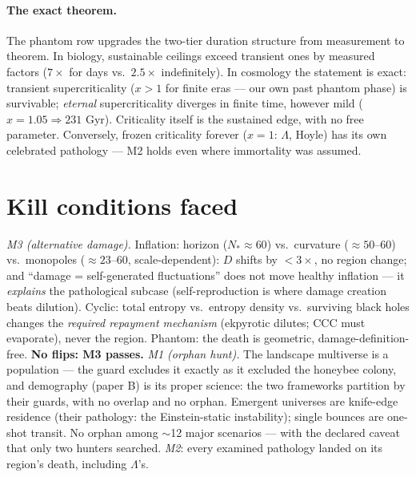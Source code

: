 \documentclass[11pt]{article}
\begin{document}
\paragraph{The exact theorem.} The phantom row upgrades the two-tier duration structure from
measurement to theorem. In biology, sustainable ceilings exceed transient ones by measured
factors ($7\times$ for days vs.\ $2.5\times$ indefinitely). In cosmology the statement is exact:
transient supercriticality ($x > 1$ for finite eras --- our own past phantom phase) is
survivable; \emph{eternal} supercriticality diverges in finite time, however mild
($x = 1.05 \Rightarrow 231$ Gyr). Criticality itself is the sustained edge, with no free
parameter. Conversely, frozen criticality forever ($x = 1$: $\Lambda$, Hoyle) has its own
celebrated pathology \cite{DKS} --- M2 holds even where immortality was assumed.

\section{Kill conditions faced}
\emph{M3 (alternative damage).} Inflation: horizon ($N_* \approx 60$) vs.\ curvature
($\approx 50$--$60$) vs.\ monopoles ($\approx 23$--$60$, scale-dependent): $D$ shifts by
$< 3\times$, no region change; and ``damage = self-generated fluctuations'' does not move
healthy inflation --- it \emph{explains} the pathological subcase (self-reproduction is where
damage creation beats dilution). Cyclic: total entropy vs.\ entropy density vs.\ surviving
black holes changes the \emph{required repayment mechanism} (ekpyrotic dilutes; CCC must
evaporate), never the region. Phantom: the death is geometric, damage-definition-free.
\textbf{No flips: M3 passes.} \emph{M1 (orphan hunt).} The landscape multiverse is a population
--- the guard excludes it exactly as it excluded the honeybee colony, and demography (paper B)
is its proper science: the two frameworks partition by their guards, with no overlap and no
orphan. Emergent universes are knife-edge residence (their pathology: the Einstein-static
instability); single bounces are one-shot transit. No orphan among $\sim$12 major scenarios ---
with the declared caveat that only two hunters searched. \emph{M2}: every examined pathology
landed on its region's death, including $\Lambda$'s.
\end{document}
